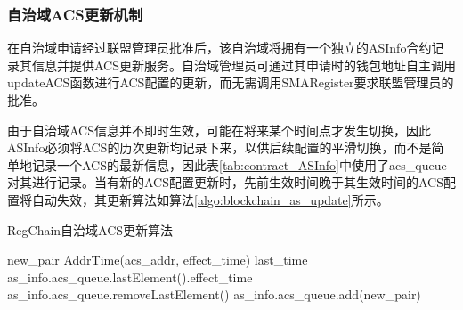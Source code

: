       \subsubsection{自治域ACS更新机制}
      在自治域申请经过联盟管理员批准后，该自治域将拥有一个独立的ASInfo合约记录其信息并提供ACS更新服务。自治域管理员可通过其申请时的钱包地址自主调用updateACS函数进行ACS配置的更新，而无需调用SMARegister要求联盟管理员的批准。

      由于自治域ACS信息并不即时生效，可能在将来某个时间点才发生切换，因此ASInfo必须将ACS的历次更新均记录下来，以供后续配置的平滑切换，而不是简单地记录一个ACS的最新信息，因此表\ref{tab:contract_ASInfo}中使用了acs\_queue对其进行记录。当有新的ACS配置更新时，先前生效时间晚于其生效时间的ACS配置将自动失效，其更新算法如算法\ref{algo:blockchain_as_update}所示。

      \begin{algorithm}
        \caption{RegChain自治域ACS更新算法}
        \label{algo:blockchain_as_update}
        
        \LinesNumbered

        
        
        



        new\_pair \gets \KwNew AddrTime(acs\_addr, effect\_time)\;
         {
            last\_time \gets as\_info.acs\_queue.lastElement().effect\_time\;
             {
                as\_info.acs\_queue.removeLastElement()\;
            }
            \Else {
                \KwBreak\;
            }
        }
        as\_info.acs\_queue.add(new\_pair)\;
      \end{algorithm}


